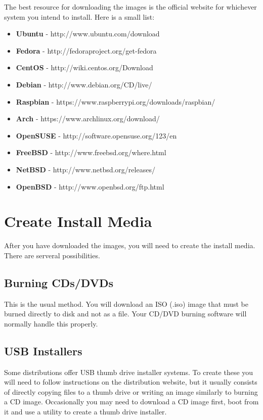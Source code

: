 The best resource for downloading the images is the official website for whichever system you intend to install. Here is a small list:\\

\begin{itemize}

\item
\textbf{Ubuntu} - http://www.ubuntu.com/download
\item
\textbf{Fedora} - http://fedoraproject.org/get-fedora
\item
\textbf{CentOS} - http://wiki.centos.org/Download
\item
\textbf{Debian} - http://www.debian.org/CD/live/
\item
\textbf{Raspbian} - https://www.raspberrypi.org/downloads/raspbian/
\item
\textbf{Arch} - https://www.archlinux.org/download/
\item
\textbf{OpenSUSE} - http://software.opensuse.org/123/en
\item
\textbf{FreeBSD} - http://www.freebsd.org/where.html
\item
\textbf{NetBSD} - http://www.netbsd.org/releases/
\item
\textbf{OpenBSD} - http://www.openbsd.org/ftp.html

\end{itemize}

\section{Create Install Media}

After you have downloaded the images, you will need to create the install media.  There are serveral possibilities.

\subsection{Burning CDs/DVDs}

This is the usual method.  You will download an ISO (.iso) image that must be burned directly to disk and not as a file.  Your CD/DVD burning software will normally handle this properly.

\subsection{USB Installers}

Some distributions offer USB thumb drive installer systems.  To create these you will need to follow instructions on the distribution website, but it usually consists of directly copying files to a thumb drive or writing an image similarly to burning a CD image.  Occasionally you may need to download a CD image first, boot from it and use a utility to create a thumb drive installer.

